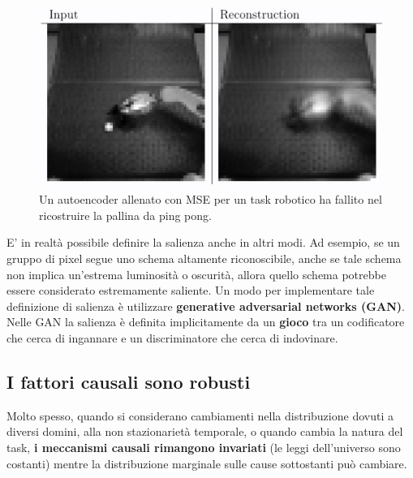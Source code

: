 \begin{figure}[!h]
  \centering
  \includegraphics[scale=.4]{images/representation_learning/encode.png}
  \caption{Un autoencoder allenato con MSE per un task robotico ha fallito nel ricostruire la pallina da
  ping pong.}
\end{figure}
\newpage
E' in realtà possibile definire la salienza anche in altri modi.
\newline
Ad esempio, se un gruppo di pixel segue uno schema altamente riconoscibile, anche se tale schema non implica
un'estrema luminosità o oscurità, allora quello schema potrebbe essere considerato estremamente saliente.
\newline
Un modo per implementare tale definizione di salienza è utilizzare \textbf{generative adversarial networks
(GAN)}. Nelle GAN la salienza è definita implicitamente da un \textbf{gioco} tra un codificatore che cerca 
di ingannare e un discriminatore che cerca di indovinare.

\subsection{I fattori causali sono robusti}
Molto spesso, quando si considerano cambiamenti nella distribuzione dovuti a diversi domini, alla non 
stazionarietà temporale, o quando cambia la natura del task, \textbf{i meccanismi causali rimangono invariati} 
(le leggi dell'universo sono costanti) mentre la distribuzione marginale sulle cause sottostanti può cambiare.
\newpage
